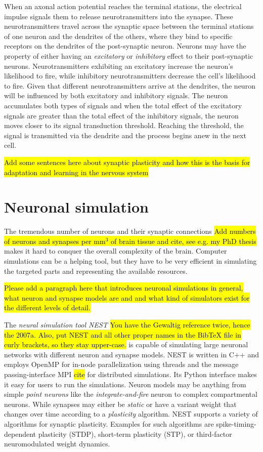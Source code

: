 When an axonal action potential reaches the terminal stations, the electrical impulse signals them to release neurotransmitters into the synapse. These neurotransmitters travel across the synaptic space between the terminal stations of one neuron and the dendrites of the others, where they bind to specific receptors on the dendrites of the post-synaptic neuron. Neurons may have the property of either having an \emph{excitatory} or \emph{inhibitory} effect to their post-synaptic neurons. Neurotransmitters exhibiting an excitatory increase the neuron's likelihood to fire, while inhibitory neurotransmitters decrease the cell's likelihood to fire. Given that different neurotransmitters arrive at the dendrites, the neuron will be influenced by both excitatory and inhibitory signals. The neuron accumulates both types of signals and when the total effect of the excitatory signals are greater than the total effect of the inhibitory signals, the neuron moves closer to its signal transduction threshold. Reaching the threshold, the signal is transmitted via the dendrite and the process begins anew in the next cell.

\hl{Add some sentences here about synaptic plasticity and how this is the basis for adaptation and learning in the nervous system}

\section{Neuronal simulation}

The tremendous number of neurons and their synaptic connections \hl{Add numbers of neurons and synapses per mm$^3$ of brain tissue and cite, see e.g. my PhD thesis} makes it hard to conquer the overall complexity of the brain. Computer simulations can be a helping tool, but they have to be very efficient  in simulating the targeted parts and representing the available resources.

\hl{Please add a paragraph here that introduces neuronal simulations in general, what neuron and synapse models are and and what kind of simulators exist for the different levels of detail.}

The \emph{neural simulation tool NEST} \citep{Gewaltig:NEST, spreizer_sebastian_2022_6368024} \hl{You have the Gewaltig reference twice, hence the 2007a. Also, put NEST and all other proper names in the BibTeX file in curly brackets, so they stay upper-case.} is capable of simulating large neuronal networks with different neuron and synapse models. NEST is written in C++ and employs OpenMP for in-node parallelization using threads and the message passing-interface MPI \hl{cite} for distributed simulations. Its Python interface \citep[\emph{PyNEST};][]{10.3389/neuro.11.012.2008} makes it easy for users to run the simulations. Neuron models may be anything from simple \emph{point neurons} like the \emph{integrate-and-fire} neuron to complex compartmental neurons. While synapses may either be \emph{static} or have a variant weight that changes over time according to a \emph{plasticity} algorithm. NEST supports a variety of algorithms for synaptic plasticity. Examples for such algorithms are spike-timing-dependent plasticity (STDP), short-term plasticity (STP), or third-factor neuromodulated weight dynamics.


